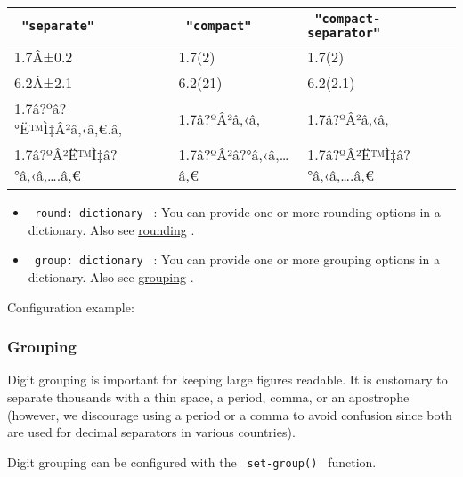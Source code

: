 \begin{longtable}[]{@{}lll@{}}
\toprule\noalign{}
\texttt{\ "separate"\ } & \texttt{\ "compact"\ } &
\texttt{\ "compact-separator"\ } \\
\midrule\noalign{}
\endhead
\bottomrule\noalign{}
\endlastfoot
1.7Â±0.2 & 1.7(2) & 1.7(2) \\
6.2Â±2.1 & 6.2(21) & 6.2(2.1) \\
1.7â?ºâ?°Ë™Ì‡Â²â‚‹â‚€.â‚ & 1.7â?ºÂ²â‚‹â‚ & 1.7â?ºÂ²â‚‹â‚ \\
1.7â?ºÂ²Ë™Ì‡â?°â‚‹â‚\ldots.â‚€ & 1.7â?ºÂ²â?°â‚‹â‚\ldots â‚€ &
1.7â?ºÂ²Ë™Ì‡â?°â‚‹â‚\ldots.â‚€ \\
\end{longtable}

\begin{itemize}
\tightlist
\item
  \texttt{\ round:\ dictionary\ } : You can provide one or more rounding
  options in a dictionary. Also see
  \href{https://github.com/typst/packages/raw/main/packages/preview/zero/0.3.0/\#rounding}{rounding}
  .
\item
  \texttt{\ group:\ dictionary\ } : You can provide one or more grouping
  options in a dictionary. Also see
  \href{https://github.com/typst/packages/raw/main/packages/preview/zero/0.3.0/\#grouping}{grouping}
  .
\end{itemize}

Configuration example:

\begin{Shaded}
\begin{Highlighting}[]
\end{Highlighting}
\end{Shaded}

\subsubsection{Grouping}\label{grouping}

Digit grouping is important for keeping large figures readable. It is
customary to separate thousands with a thin space, a period, comma, or
an apostrophe (however, we discourage using a period or a comma to avoid
confusion since both are used for decimal separators in various
countries).


Digit grouping can be configured with the \texttt{\ set-group()\ }
function.

